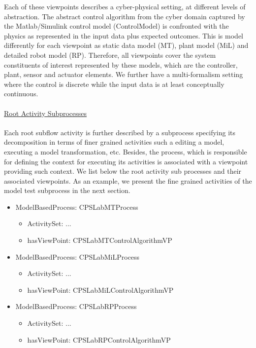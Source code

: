 Each of these viewpoints describes a cyber-physical setting, at different levels of abstraction. The abstract control algorithm from the cyber domain captured by the Matlab/Simulink control model (ControlModel) is confronted with the physics as represented in the input data plus expected outcomes. This is model differently for each viewpoint as static data model (MT), plant model (MiL) and detailed robot model (RP). Therefore, all viewpoints cover the system constituents of interest represented by these models, which are the controller, plant, sensor and actuator elements. We further have a multi-formalism setting where the control is discrete while the input data is at least conceptually continuous.
\\
\\
\noindent\uline{Root Activity Subprocesses}
\\
\\
Each root subflow activity is further described by a subprocess specifying its decomposition in terms of finer grained activities such a editing a model, executing a model transformation, etc. Besides, the process, which is responsible for defining the context for executing its activities is associated with a viewpoint providing such context. We list below the root activity sub processes and their associated viewpoints. As an example, we present the fine grained activities of the model test subprocess in the next section. 

\begin{itemize}
    \item ModelBasedProcess: CPSLabMTProcess 
        \begin{itemize}
            \item ActivitySet: ...
            \item hasViewPoint: CPSLabMTControlAlgorithmVP
        \end{itemize}
    \item ModelBasedProcess: CPSLabMiLProcess 
        \begin{itemize}
            \item ActivitySet: ...
            \item hasViewPoint: CPSLabMiLControlAlgorithmVP
        \end{itemize}
    \item ModelBasedProcess: CPSLabRPProcess 
        \begin{itemize}
            \item ActivitySet: ...
            \item hasViewPoint: CPSLabRPControlAlgorithmVP
        \end{itemize}
\end{itemize}

